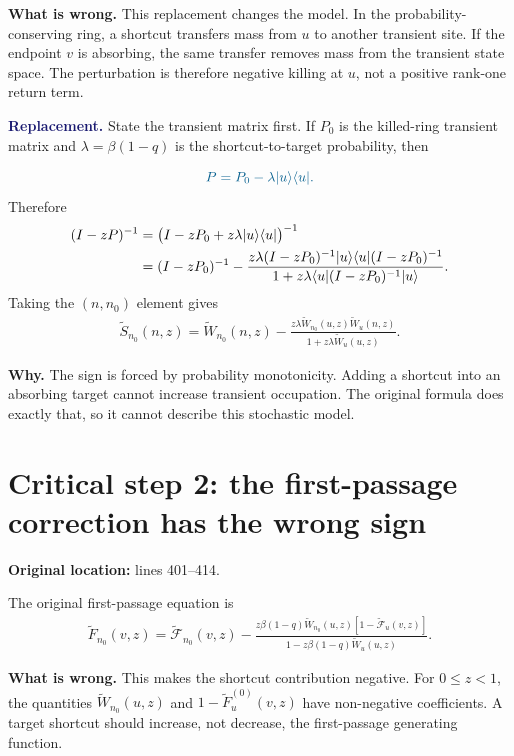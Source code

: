 \documentclass[11pt]{article}
\newcommand{\wt}{\widetilde}
\newcommand{\Corrected}[1]{\textcolor{MidnightBlue}{#1}}
\newcommand{\Issue}[1]{\par\smallskip\noindent\textbf{\textcolor{BrickRed}{What is wrong.}} #1\par}
\newcommand{\Fix}[1]{\par\smallskip\noindent\textbf{\textcolor{MidnightBlue}{Replacement.}} #1\par}
\newcommand{\Why}[1]{\par\smallskip\noindent\textbf{Why.} #1\par}
\begin{document}
\Issue{This replacement changes the model.  In the probability-conserving ring,
a shortcut transfers mass from $u$ to another transient site.  If the endpoint
$v$ is absorbing, the same transfer removes mass from the transient state
space.  The perturbation is therefore negative killing at $u$, not a positive
rank-one return term.}

\Fix{State the transient matrix first.  If $P_0$ is the killed-ring transient
matrix and $\lambda=\beta(1-q)$ is the shortcut-to-target probability, then}
\begin{equation}
  \Corrected{P=P_0-\lambda |u\rangle\langle u|.}
  \label{eq:transient-killing}
\end{equation}
Therefore
\begin{align}
  (I-zP)^{-1}
  &=\bigl(I-zP_0+z\lambda |u\rangle\langle u|\bigr)^{-1} \notag\\
  &= (I-zP_0)^{-1}
  -\frac{z\lambda (I-zP_0)^{-1}|u\rangle\langle u|(I-zP_0)^{-1}}
  {1+z\lambda\langle u|(I-zP_0)^{-1}|u\rangle}.
\end{align}
Taking the $(n,n_0)$ element gives
\begingroup\color{MidnightBlue}
\begin{align}
\wt S_{n_0}(n,z)=\wt W_{n_0}(n,z)
-\frac{z\lambda\wt W_{n_0}(u,z)\wt W_u(n,z)}
{1+z\lambda\wt W_u(u,z)}.
\tag{C1}
\end{align}
\endgroup

\Why{The sign is forced by probability monotonicity.  Adding a shortcut into an
absorbing target cannot increase transient occupation.  The original formula
does exactly that, so it cannot describe this stochastic model.}

\section{Critical step 2: the first-passage correction has the wrong sign}

\textbf{Original location:} lines 401--414.

The original first-passage equation is
\begingroup\color{BrickRed}
\begin{align}
\wt F_{n_0}(v,z)=\wt{\mathcal F}_{n_0}(v,z)
-\frac{z\beta(1-q)\wt W_{n_0}(u,z)
\left[1-\wt{\mathcal F}_u(v,z)\right]}
{1-z\beta(1-q)\wt W_u(u,z)}.
\tag{O3}
\end{align}
\endgroup

\Issue{This makes the shortcut contribution negative.  For $0\leq z<1$, the
quantities $\wt W_{n_0}(u,z)$ and $1-\wt F_u^{(0)}(v,z)$ have non-negative
coefficients.  A target shortcut should increase, not decrease, the
first-passage generating function.}
\end{document}
